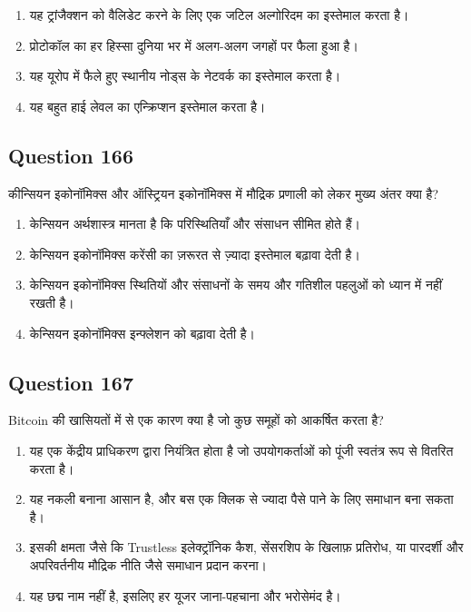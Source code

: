 \documentclass[12pt,a4paper]{article}
\begin{document}
\begin{enumerate}[label=\Alph*., leftmargin=*]
\item यह ट्रांजैक्शन को वैलिडेट करने के लिए एक जटिल अल्गोरिदम का इस्तेमाल करता है।
\item प्रोटोकॉल का हर हिस्सा दुनिया भर में अलग-अलग जगहों पर फैला हुआ है।
\item यह यूरोप में फैले हुए स्थानीय नोड्स के नेटवर्क का इस्तेमाल करता है।
\item यह बहुत हाई लेवल का एन्क्रिप्शन इस्तेमाल करता है।
\end{enumerate}

\bigskip


\subsection*{Question 166}
कीन्सियन इकोनॉमिक्स और ऑस्ट्रियन इकोनॉमिक्स में मौद्रिक प्रणाली को लेकर मुख्य अंतर क्या है?

\begin{enumerate}[label=\Alph*., leftmargin=*]
\item केन्सियन अर्थशास्त्र मानता है कि परिस्थितियाँ और संसाधन सीमित होते हैं।
\item केन्सियन इकोनॉमिक्स करेंसी का ज़रूरत से ज़्यादा इस्तेमाल बढ़ावा देती है।
\item केन्सियन इकोनॉमिक्स स्थितियों और संसाधनों के समय और गतिशील पहलुओं को ध्यान में नहीं रखती है।
\item केन्सियन इकोनॉमिक्स इन्फ्लेशन को बढ़ावा देती है।
\end{enumerate}

\bigskip


\subsection*{Question 167}
Bitcoin की खासियतों में से एक कारण क्या है जो कुछ समूहों को आकर्षित करता है?

\begin{enumerate}[label=\Alph*., leftmargin=*]
\item यह एक केंद्रीय प्राधिकरण द्वारा नियंत्रित होता है जो उपयोगकर्ताओं को पूंजी स्वतंत्र रूप से वितरित करता है।
\item यह नकली बनाना आसान है, और बस एक क्लिक से ज्यादा पैसे पाने के लिए समाधान बना सकता है।
\item इसकी क्षमता जैसे कि Trustless इलेक्ट्रॉनिक कैश, सेंसरशिप के खिलाफ़ प्रतिरोध, या पारदर्शी और अपरिवर्तनीय मौद्रिक नीति जैसे समाधान प्रदान करना।
\item यह छद्म नाम नहीं है, इसलिए हर यूजर जाना-पहचाना और भरोसेमंद है।
\end{enumerate}
\end{document}
